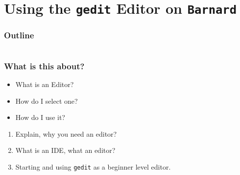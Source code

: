 \section{Using the \texttt{gedit} Editor on \texttt{Barnard}}

\begin{frame}
	\frametitle{Outline}
	\begin{columns}[t]
		\begin{column}{.5\textwidth}
			\tableofcontents[sections={1-9},currentsection]
		\end{column}
		\begin{column}{.5\textwidth}
			\tableofcontents[sections={10-18},currentsection]
		\end{column}
	\end{columns}
\end{frame}

\begin{frame}
	\frametitle{What is this about?}
	\begin{question}[Questions]\begin{itemize}
			\item What is an Editor?
			\item How do I select one?
			\item How do I use it?
		\end{itemize}
	\end{question}
	\begin{docs}[Objectives]
		\begin{enumerate}
			\item Explain, why you need an editor?
			\item What is an IDE, what an editor?
			\item Starting and using \texttt{gedit} as a beginner level editor.
		\end{enumerate}
	\end{docs}
\end{frame}

